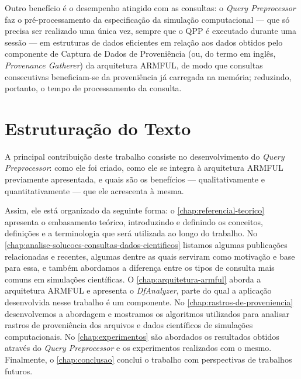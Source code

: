 Outro benefício é o desempenho atingido com as consultas: o \textit{Query Preprocessor} faz o pré-processamento da especificação da simulação computacional --- que só precisa ser realizado uma única vez, sempre que o QPP é executado durante uma sessão --- em estruturas de dados eficientes em relação aos dados obtidos pelo componente de Captura de Dados de Proveniência (ou, do termo em inglês, \textit{Provenance Gatherer}) da arquitetura ARMFUL, de modo que consultas consecutivas beneficiam-se da proveniência já carregada na memória; reduzindo, portanto, o tempo de processamento da consulta.

\section{Estruturação do Texto}

A principal contribuição deste trabalho consiste no desenvolvimento do \textit{Query Preprocessor}: como ele foi criado, como ele se integra à arquitetura ARMFUL previamente apresentada, e quais são os benefícios --- qualitativamente e quantitativamente --- que ele acrescenta à mesma.

Assim, ele está organizado da seguinte forma:
o \autoref{chap:referencial-teorico} apresenta o embasamento teórico, introduzindo e definindo os conceitos, definições e a terminologia que será utilizada ao longo do trabalho.
No \autoref{chap:analise-solucoes-consultas-dados-cientificos} listamos algumas publicações relacionadas e recentes, algumas dentre as quais serviram como motivação e base para essa, e também abordamos a diferença entre os tipos de consulta mais comuns em simulações científicas.
O \autoref{chap:arquitetura-armful} aborda a arquitetura ARMFUL e apresenta o \textit{DfAnalyzer}, parte do qual a aplicação desenvolvida nesse trabalho é um componente.
No \autoref{chap:rastros-de-proveniencia} desenvolvemos a abordagem e mostramos os algoritmos utilizados para analisar rastros de proveniência dos arquivos e dados científicos de simulações computacionais.
No \autoref{chap:experimentos} são abordados os resultados obtidos através do \textit{Query Preprocessor} e os experimentos realizados com o mesmo.
Finalmente, o \autoref{chap:conclusao} conclui o trabalho com perspectivas de trabalhos futuros.
